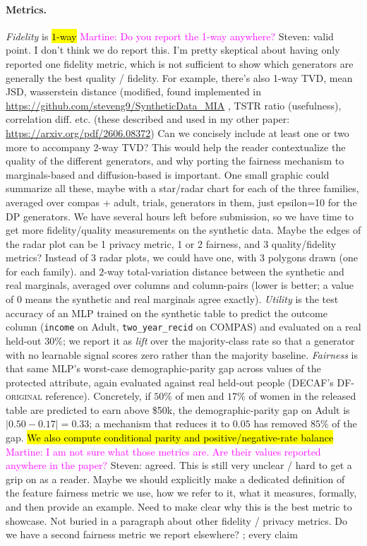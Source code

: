 \documentclass{article}
\newcommand{\martine}[1]{\textcolor{magenta}{Martine: #1}}
\newcommand{\s}[1]{\textcolor{Dandelion}{Steven: #1}}
\begin{document}
\paragraph{Metrics.}
\emph{Fidelity} is \hl{$1$-way} \martine{Do you report the 1-way anywhere?} \s{valid point. I don't think we do report this. I'm pretty skeptical about having only reported one fidelity metric, which is not sufficient to show which generators are generally the best quality / fidelity. For example, there's also 1-way TVD, mean JSD, wasserstein distance (modified, found implemented in \url{https://github.com/steveng9/SyntheticData_MIA} , TSTR ratio (usefulness), correlation diff. etc. (these described and used in my other paper: \url{https://arxiv.org/pdf/2606.08372}) Can we concisely include at least one or two more to accompany 2-way TVD? This would help the reader contextualize the quality of the different generators, and why porting the fairness mechanism to marginals-based and diffusion-based is important. One small graphic could summarize all these, maybe with a star/radar chart for each of the three families, averaged over compas + adult, trials, generators in them, just epsilon=10 for the DP generators. We have several hours left before submission, so we have time to get more fidelity/quality measurements on the synthetic data. Maybe the edges of the radar plot can be 1 privacy metric, 1 or 2 fairness, and 3 quality/fidelity metrics? Instead of 3 radar plots, we could have one, with 3 polygons drawn (one for each family).} and $2$-way total-variation distance between the
synthetic and real marginals, averaged over columns and column-pairs (lower
is better; a value of $0$ means the synthetic and real marginals agree
exactly). \emph{Utility} is the test accuracy of an MLP trained on the
synthetic table to predict the outcome column (\texttt{income} on Adult,
\texttt{two\_year\_recid} on COMPAS) and evaluated on a real held-out $30\%$;
we report it as \emph{lift} over the majority-class rate so that a generator
with no learnable signal scores zero rather than the majority baseline.
\emph{Fairness} is that same MLP's worst-case demographic-parity gap across
values of the protected attribute, again evaluated against real held-out
people (DECAF's DF-\textsc{original} reference). Concretely, if $50\%$ of men
and $17\%$ of women in the released table are predicted to earn above
\$50k, the demographic-parity gap on Adult is $|0.50-0.17|=0.33$; a
mechanism that reduces it to $0.05$ has removed $85\%$ of the gap. \hl{We also
compute conditional parity and positive/negative-rate balance} \martine{I am not sure what those metrics are. Are their values reported anywhere in the paper?} \s{agreed. This is still very unclear / hard to get a grip on as a reader. Maybe we should explicitly make a dedicated definition of the feature fairness metric we use, how we refer to it, what it measures, formally, and then provide an example. Need to make clear why this is the best metric to showcase. 
Not buried in a paragraph about other fidelity / privacy metrics. Do we have a second fairness metric we report elsewhere? };  every claim
\end{document}
